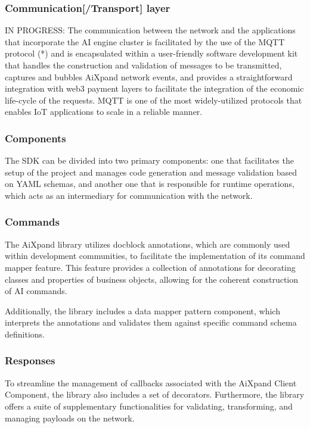 \documentclass{article}
\begin{document}
\subsubsection{Communication[/Transport] layer} IN PROGRESS:
The communication between the network and the applications that incorporate the AI engine cluster is facilitated by the use of the MQTT protocol (*) and is encapsulated within a user-friendly software development kit that handles the construction and validation of messages to be transmitted, captures and bubbles AiXpand network events, and provides a straightforward integration with web3 payment layers to facilitate the integration of the economic life-cycle of the requests. MQTT is one of the most widely-utilized protocols that enables IoT applications to scale in a reliable manner.

\subsubsection{Components}
The SDK can be divided into two primary components: one that facilitates the setup of the project and manages code generation and message validation based on YAML schemas, and another one that is responsible for runtime operations, which acts as an intermediary for communication with the network.

\subsubsection{Commands}
The AiXpand library utilizes docblock annotations, which are commonly used within development communities, to facilitate the implementation of its command mapper feature. This feature provides a collection of annotations for decorating classes and properties of business objects, allowing for the coherent construction of AI commands. 

Additionally, the library includes a data mapper pattern component, which interprets the annotations and validates them against specific command schema definitions. 

\subsubsection{Responses}
To streamline the management of callbacks associated with the AiXpand Client Component, the library also includes a set of decorators. Furthermore, the library offers a suite of supplementary functionalities for validating, transforming, and managing payloads on the network.
\end{document}

